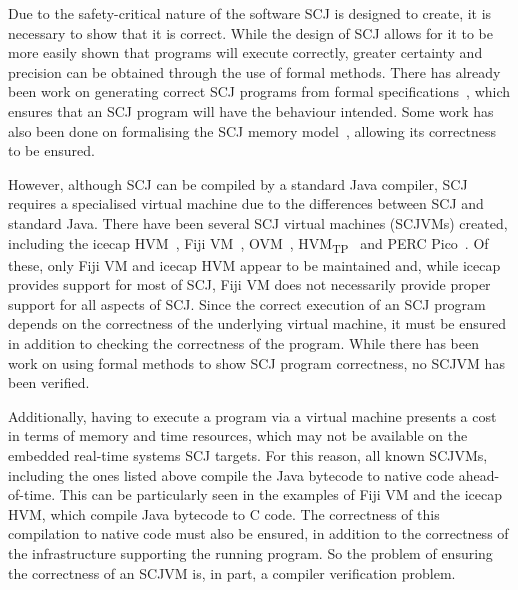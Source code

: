\documentclass[a4paper,10pt]{report}
\begin{document}
Due to the safety-critical nature of the software SCJ is designed to
create, it is necessary to show that it is correct.
While the design of SCJ allows for it to be more easily shown that
programs will execute correctly, greater certainty and precision can
be obtained through the use of formal methods.
There has already been work on generating correct SCJ programs from
formal specifications~\cite{cavalcanti2011, cavalcanti2013}, which
ensures that an SCJ program will have the behaviour intended.
Some work has also been done on formalising the SCJ memory
model~\cite{cavalcanti2011a}, allowing its correctness to be ensured.

However, although SCJ can be compiled by a standard Java compiler, SCJ
requires a specialised virtual machine due to the differences between
SCJ and standard Java.
There have been several SCJ virtual machines (SCJVMs) created,
including the icecap HVM~\cite{sondergaard2012}, Fiji
VM~\cite{pizlo2009}, OVM~\cite{armbruster2007},
HVM\textsubscript{TP}~\cite{luckow2014} and PERC Pico~\cite{atego2015,
  richard2010}.
Of these, only Fiji VM and icecap HVM appear to be maintained and,
while icecap provides support for most of SCJ, Fiji VM does not
necessarily provide proper support for all aspects of SCJ.
Since the correct execution of an SCJ program depends on the
correctness of the underlying virtual machine, it must be ensured in
addition to checking the correctness of the program.
While there has been work on using formal methods to show SCJ program
correctness, no SCJVM has been verified.

Additionally, having to execute a program via a virtual machine
presents a cost in terms of memory and time resources, which may not
be available on the embedded real-time systems SCJ targets.
For this reason, all known SCJVMs, including the ones listed above
compile the Java bytecode to native code ahead-of-time.
This can be particularly seen in the examples of Fiji VM and the
icecap HVM, which compile Java bytecode to C code.
The correctness of this compilation to native code must also be
ensured, in addition to the correctness of the infrastructure
supporting the running program.
So the problem of ensuring the correctness of an SCJVM is, in part, a
compiler verification problem.
\end{document}
